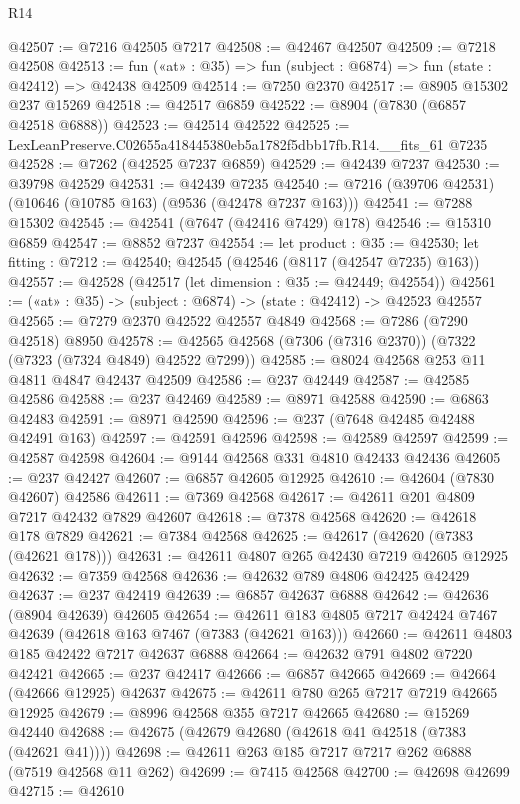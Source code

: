 \begin{lexlean}{R14}
\begin{coremodule}
@42507 := @7216 @42505 @7217
@42508 := @42467 @42507
@42509 := @7218 @42508
@42513 := fun («at» : @35) => fun (subject : @6874) => fun (state : @42412) => @42438 @42509
@42514 := @7250 @2370
@42517 := @8905 @15302 @237 @15269
@42518 := @42517 @6859
@42522 := @8904 (@7830 (@6857 @42518 @6888))
@42523 := @42514 @42522
@42525 := LexLeanPreserve.C02655a418445380eb5a1782f5dbb17fb.R14.__fits_61 @7235
@42528 := @7262 (@42525 @7237 @6859)
@42529 := @42439 @7237
@42530 := @39798 @42529
@42531 := @42439 @7235
@42540 := @7216 (@39706 @42531) (@10646 (@10785 @163) (@9536 (@42478 @7237 @163)))
@42541 := @7288 @15302
@42545 := @42541 (@7647 (@42416 @7429) @178)
@42546 := @15310 @6859
@42547 := @8852 @7237
@42554 := let product : @35 := @42530;
  let fitting : @7212 := @42540; @42545 (@42546 (@8117 (@42547 @7235) @163))
@42557 := @42528 (@42517 (let dimension : @35 := @42449; @42554))
@42561 := («at» : @35) -> (subject : @6874) -> (state : @42412) -> @42523 @42557
@42565 := @7279 @2370 @42522 @42557 @4849
@42568 := @7286 (@7290 @42518) @8950
@42578 := @42565 @42568 (@7306 (@7316 @2370)) (@7322 (@7323 (@7324 @4849) @42522 @7299))
@42585 := @8024 @42568 @253 @11 @4811 @4847 @42437 @42509
@42586 := @237 @42449
@42587 := @42585 @42586
@42588 := @237 @42469
@42589 := @8971 @42588
@42590 := @6863 @42483
@42591 := @8971 @42590
@42596 := @237 (@7648 @42485 @42488 @42491 @163)
@42597 := @42591 @42596
@42598 := @42589 @42597
@42599 := @42587 @42598
@42604 := @9144 @42568 @331 @4810 @42433 @42436
@42605 := @237 @42427
@42607 := @6857 @42605 @12925
@42610 := @42604 (@7830 @42607) @42586
@42611 := @7369 @42568
@42617 := @42611 @201 @4809 @7217 @42432 @7829 @42607
@42618 := @7378 @42568
@42620 := @42618 @178 @7829
@42621 := @7384 @42568
@42625 := @42617 (@42620 (@7383 (@42621 @178)))
@42631 := @42611 @4807 @265 @42430 @7219 @42605 @12925
@42632 := @7359 @42568
@42636 := @42632 @789 @4806 @42425 @42429
@42637 := @237 @42419
@42639 := @6857 @42637 @6888
@42642 := @42636 (@8904 @42639) @42605
@42654 := @42611 @183 @4805 @7217 @42424 @7467 @42639 (@42618 @163 @7467 (@7383 (@42621 @163)))
@42660 := @42611 @4803 @185 @42422 @7217 @42637 @6888
@42664 := @42632 @791 @4802 @7220 @42421
@42665 := @237 @42417
@42666 := @6857 @42665
@42669 := @42664 (@42666 @12925) @42637
@42675 := @42611 @780 @265 @7217 @7219 @42665 @12925
@42679 := @8996 @42568 @355 @7217 @42665
@42680 := @15269 @42440
@42688 := @42675 (@42679 @42680 (@42618 @41 @42518 (@7383 (@42621 @41))))
@42698 := @42611 @263 @185 @7217 @7217 @262 @6888 (@7519 @42568 @11 @262)
@42699 := @7415 @42568
@42700 := @42698 @42699
@42715 := @42610

\end{coremodule}
\end{lexlean}
